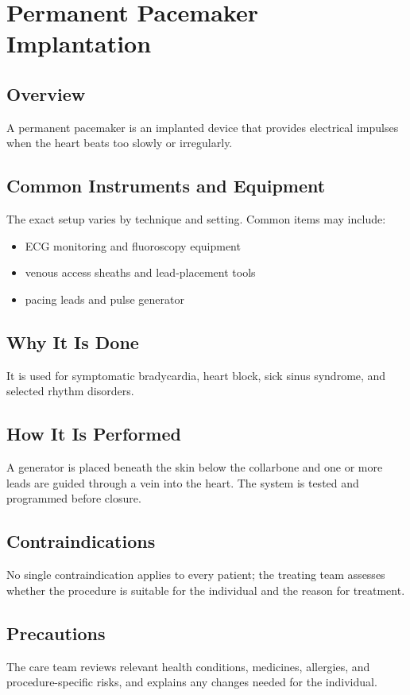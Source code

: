\chapter{Permanent Pacemaker Implantation}
\section*{Overview}
A permanent pacemaker is an implanted device that provides electrical impulses when the heart beats too slowly or irregularly.
\section*{Common Instruments and Equipment}
The exact setup varies by technique and setting. Common items may include:
\begin{itemize}[nosep,leftmargin=*]
  \item ECG monitoring and fluoroscopy equipment
  \item venous access sheaths and lead-placement tools
  \item pacing leads and pulse generator
\end{itemize}

\section*{Why It Is Done}
It is used for symptomatic bradycardia, heart block, sick sinus syndrome, and selected rhythm disorders.
\section*{How It Is Performed}
A generator is placed beneath the skin below the collarbone and one or more leads are guided through a vein into the heart. The system is tested and programmed before closure.
\section*{Contraindications}
No single contraindication applies to every patient; the treating team assesses whether the procedure is suitable for the individual and the reason for treatment.

\section*{Precautions}
The care team reviews relevant health conditions, medicines, allergies, and procedure-specific risks, and explains any changes needed for the individual.

